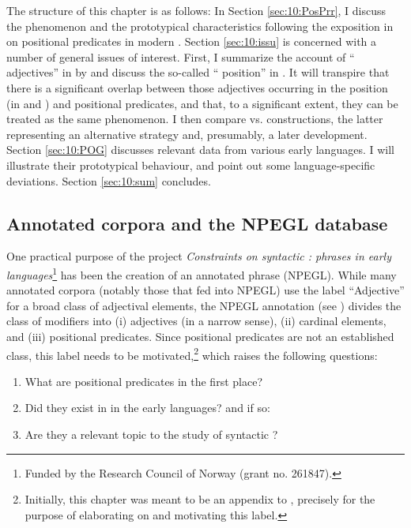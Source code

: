 \documentclass[output=paper,colorlinks,citecolor=brown]{langscibook}
\begin{document}
The structure of this chapter is as follows: In Section \ref{sec:10:PosPrr}, I discuss the phenomenon and the prototypical characteristics following the exposition in \citet{Pfaff2015,Pfaff2017} on positional predicates in modern . Section \ref{sec:10:issu} is concerned with a number of general issues of interest. First, I summarize the account of `` adjectives'' in  by \citet{Marib} and discuss the so-called `` position'' in . It will transpire that there is a significant overlap between those  adjectives occurring in the  position (in  and ) and positional predicates, and that, to a significant extent, they can be treated as the same phenomenon.
I then compare  vs.  constructions, the latter representing an alternative strategy and, presumably, a later development. Section \ref{sec:10:POG} discusses relevant data from various early  languages. I will illustrate their prototypical behaviour, and  point out some language-specific deviations. Section \ref{sec:10:sum} concludes.




\subsection{Annotated corpora and the NPEGL database}
\label{sec:10:npegl}

\begin{sloppypar}
One practical purpose of the project \emph{Constraints on syntactic :  phrases in early  languages}\footnote{Funded by the Research Council of Norway (grant no. 261847).} has been the creation of an annotated  phrase  (NPEGL). While many annotated corpora (notably those that fed into NPEGL) use the label ``Adjective'' for a broad class of adjectival elements, the NPEGL annotation (see ) divides the class of modifiers into (i) adjectives (in a narrow sense),  (ii) cardinal elements, and (iii) positional predicates. Since positional predicates are not an established class, this label needs to be motivated,\footnote{Initially, this chapter was meant to be an appendix to , precisely for the purpose of elaborating on and motivating this label. } which raises the following questions:
\end{sloppypar}
\begin{enumerate}
  \item[1.] What are positional predicates in the first place?
  \item[2.] Did they exist in in the early  languages? and if so:
  \item[3.] Are they a relevant topic to the study of syntactic ?
\end{enumerate}
\end{document}
